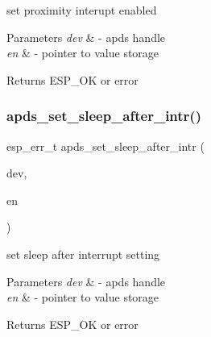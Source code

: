 \begin{DoxyItemize}
\item set proximity interupt enabled 
\end{DoxyItemize}


\begin{DoxyParams}{Parameters}
{\em dev} & -\/ apds handle \\
\hline
{\em en} & -\/ pointer to value storage \\
\hline
\end{DoxyParams}
\begin{DoxyReturn}{Returns}
E\+S\+P\+\_\+\+OK or error 
\end{DoxyReturn}
\mbox{\label{group__APDS9960__InterruptFunctions_ga248b95cc344899676855d1d3b7313822}} 
\subsubsection{\texorpdfstring{apds\+\_\+set\+\_\+sleep\+\_\+after\+\_\+intr()}{apds\_set\_sleep\_after\_intr()}}
{\footnotesize\ttfamily esp\+\_\+err\+\_\+t apds\+\_\+set\+\_\+sleep\+\_\+after\+\_\+intr (\begin{DoxyParamCaption}\item[{\hyperlink{structAPDS9960__Driver}{A\+P\+D\+S\+\_\+\+D\+EV}}]{dev,  }\item[{\hyperlink{vl53l0x__types_8h_aba7bc1797add20fe3efdf37ced1182c5}{uint8\+\_\+t} $\ast$}]{en }\end{DoxyParamCaption})}




\begin{DoxyItemize}
\item set sleep after interrupt setting 
\end{DoxyItemize}


\begin{DoxyParams}{Parameters}
{\em dev} & -\/ apds handle \\
\hline
{\em en} & -\/ pointer to value storage \\
\hline
\end{DoxyParams}
\begin{DoxyReturn}{Returns}
E\+S\+P\+\_\+\+OK or error 
\end{DoxyReturn}
